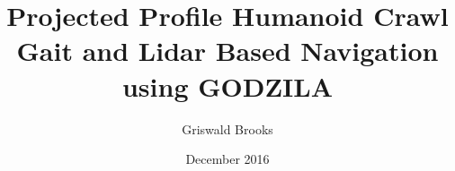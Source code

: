 
%


%


%
\graphicspath{{./pictures/}}


\renewcommand{\baselinestretch}{1.6}
\newtheorem{theorem}{Theorem}[chapter]
\newcommand{\btheorem}{\begin{theorem}\rm}
\newcommand{\etheorem}{$\diamond$\end{theorem}}
\newtheorem{definition}{Definition}[chapter]
\newcommand{\bdefn}{\begin{definition}\rm}
\newcommand{\edefn}{\end{definition}}
\newtheorem{lemma}{Lemma}[chapter]
\newtheorem{remark}{Remark}[chapter]
\newcommand{\bremark}{\begin{remark}\rm}
\newcommand{\eremark}{\end{remark}}
\newtheorem{example}{Example}[chapter]
\newcommand{\bexample}{\begin{example}\rm}
\newcommand{\eexample}{\end{example}}
\newtheorem{assumption}{Assumption}[chapter]
\newcommand{\bassump}{\begin{assumption}\rm}
\newcommand{\eassump}{\end{assumption}}


\title{Projected Profile Humanoid Crawl Gait and Lidar Based Navigation using GODZILA}
\author{Griswald Brooks}
\date{December 2016}

\mstitlepage

